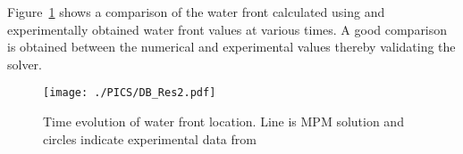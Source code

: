 Figure~\ref{Fig:TestCaseDB_Res2} shows a comparison of the water front calculated using \Ex and experimentally obtained water front values \cite{martin1952} at various times. A good comparison is obtained between the numerical and experimental values thereby validating the solver.

\begin{figure}[h]
\texttt{[image: ./PICS/DB\_Res2.pdf]}
\caption{Time evolution of water front location. Line is MPM solution and circles indicate experimental data from \cite{martin1952}}
\label{Fig:TestCaseDB_Res2}
\end{figure}
